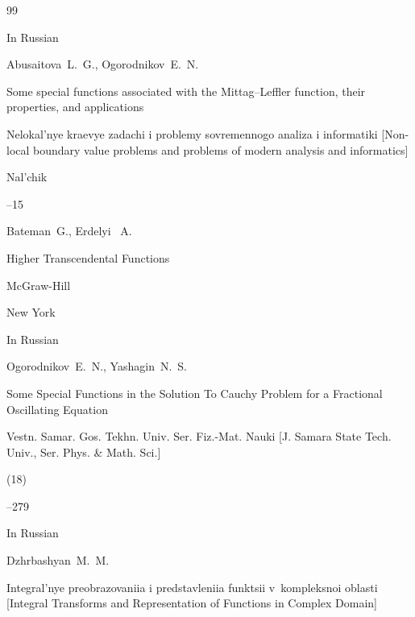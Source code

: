 \documentclass[11pt,a4paper,twoside]{article}
\begin{document}
\begin{thebibliography}{99}


\lang In Russian


\by Abusaitova~L.~G., Ogorodnikov~E.~N.


\paper Some special functions associated with the Mittag--Leffler function, their properties, and applications


\inbook Nelokal'nye kraevye zadachi i problemy sovremennogo analiza i informatiki \rm [Non-local boundary value problems and problems of modern analysis and informatics]


\publaddr Nal'chik




--15










\by Bateman~G., Erdelyi ~A.


\book Higher Transcendental Functions






\publ McGraw-Hill


\publaddr New York









\lang In Russian


\by Ogorodnikov~E.~N., Yashagin~N.~S.


\paper Some Special Functions in the Solution To Cauchy Problem for a Fractional Oscillating Equation


\jour Vestn. Samar. Gos. Tekhn. Univ. Ser. Fiz.-Mat. Nauki \rm [J. Samara State Tech. Univ., Ser. Phys. \& Math. Sci.]




(18)


--279









\lang In Russian


\by Dzhrbashyan~M.~M.


\book Integral'nye preobrazovaniia i predstavleniia funktsii v~kompleksnoi oblasti \rm [Integral Transforms and Representation of Functions in Complex Domain]



\end{thebibliography}
\end{document}
